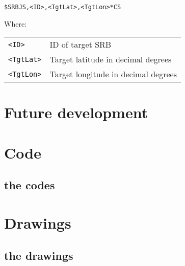 \documentclass[a4paper]{IEEEtran}
\newenvironment{nmeaspec}[1]
{
\newcommand{\field}[2]{\texttt{##1} & ##2 \\}
\vspace{0.2cm}
\noindent\texttt{#1}
\vspace{0.2cm}

\noindent Where: \vspace{0.1cm}\\  \noindent
\vspace{0.2cm}
\begin{tabular}{ll}
}
{
\end{tabular}
}
\begin{document}
\begin{nmeaspec}{\$SRBJS,<ID>,<TgtLat>,<TgtLon>*CS}
\field{<ID>}{ID of target SRB}
\field{<TgtLat>}{Target latitude in decimal degrees}
\field{<TgtLon>}{Target longitude in decimal degrees}
\end{nmeaspec}

\section{Future development}




\clearpage
\onecolumn
\appendices

\section{Code}
\subsection{the codes}

\section{Drawings}
\subsection{the drawings}
\end{document}
